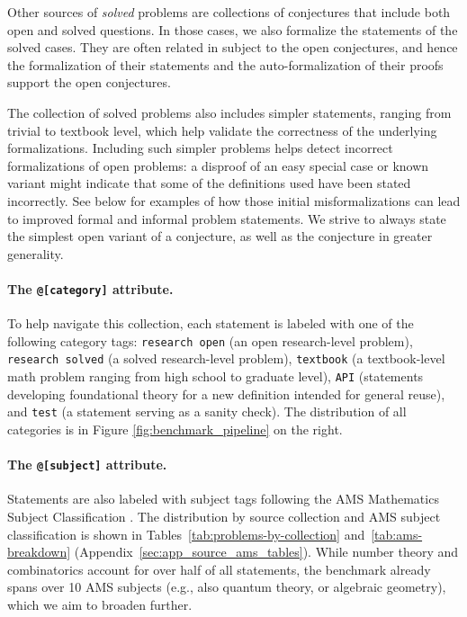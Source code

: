 Other sources of \emph{solved} problems are collections of conjectures that include both open and solved questions. In those cases, we also formalize the statements of the solved cases. They are often related in subject to the open conjectures, and hence the formalization of their statements and the auto-formalization of their proofs support the open conjectures.


The collection of solved problems also includes simpler statements, ranging from trivial to textbook level, which help validate the correctness of the underlying formalizations.
Including such simpler problems helps detect incorrect formalizations of open problems: a disproof of an easy special case or known variant might indicate that some of the definitions used have been stated incorrectly.
See below for examples of how those initial misformalizations can lead to improved formal and informal problem statements.
We strive to always state the simplest open variant of a conjecture, as well as the conjecture in greater generality.

\paragraph{The \lstinline{@[category]} attribute.}
To help navigate this collection, each statement is labeled with one of the following category tags: \lstinline[language={}]{research open} (an open research-level problem), \lstinline[language={}]{research solved} (a solved research-level problem), \lstinline[language={}]{textbook} (a textbook-level math problem ranging from high school to graduate level), \lstinline[language={}]{API} (statements developing foundational theory for a new definition intended for general reuse), and \lstinline[language={}]{test} (a statement serving as a sanity check).
The distribution of all categories is in Figure \ref{fig:benchmark_pipeline} on the right.



\paragraph{The \lstinline{@[subject]} attribute.}
Statements are also labeled with subject tags following the AMS Mathematics Subject Classification \citep{ams2020}.
The distribution by source collection and AMS subject classification is shown in Tables~\ref{tab:problems-by-collection} and~\ref{tab:ams-breakdown} (Appendix~\ref{sec:app_source_ams_tables}).
While number theory and combinatorics account for over half of all statements, the benchmark already spans over 10 AMS subjects (e.g., also quantum theory, or algebraic geometry), which we aim to broaden further.

